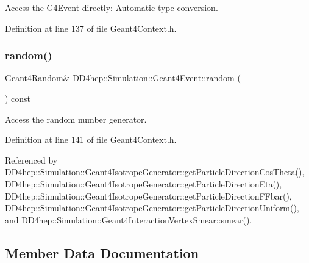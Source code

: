 Access the G4\+Event directly\+: Automatic type conversion. 



Definition at line 137 of file Geant4\+Context.\+h.

\hypertarget{class_d_d4hep_1_1_simulation_1_1_geant4_event_a3615f5c192c00ce6196f68f656deeb07}{}\label{class_d_d4hep_1_1_simulation_1_1_geant4_event_a3615f5c192c00ce6196f68f656deeb07} 
\subsubsection{\texorpdfstring{random()}{random()}}
{\footnotesize\ttfamily \hyperlink{class_d_d4hep_1_1_simulation_1_1_geant4_random}{Geant4\+Random}\& D\+D4hep\+::\+Simulation\+::\+Geant4\+Event\+::random (\begin{DoxyParamCaption}{ }\end{DoxyParamCaption}) const\hspace{0.3cm}{\ttfamily [inline]}}



Access the random number generator. 



Definition at line 141 of file Geant4\+Context.\+h.



Referenced by D\+D4hep\+::\+Simulation\+::\+Geant4\+Isotrope\+Generator\+::get\+Particle\+Direction\+Cos\+Theta(), D\+D4hep\+::\+Simulation\+::\+Geant4\+Isotrope\+Generator\+::get\+Particle\+Direction\+Eta(), D\+D4hep\+::\+Simulation\+::\+Geant4\+Isotrope\+Generator\+::get\+Particle\+Direction\+F\+Fbar(), D\+D4hep\+::\+Simulation\+::\+Geant4\+Isotrope\+Generator\+::get\+Particle\+Direction\+Uniform(), and D\+D4hep\+::\+Simulation\+::\+Geant4\+Interaction\+Vertex\+Smear\+::smear().



\subsection{Member Data Documentation}
\hypertarget{class_d_d4hep_1_1_simulation_1_1_geant4_event_a1d336fefbd6316dc5373a3b2d362cffa}{}\label{class_d_d4hep_1_1_simulation_1_1_geant4_event_a1d336fefbd6316dc5373a3b2d362cffa} 
